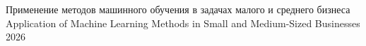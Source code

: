\documentclass{coursework}
\begin{document}
\courseworktitlepage
  {Применение методов машинного обучения в задачах малого и среднего бизнеса}
  {Application of Machine Learning Methods in Small and Medium-Sized Businesses}
  {}
  {}
  {2026}



\tableofcontents
\clearpage




% 






\printbibliography

\appendix

\end{document}
